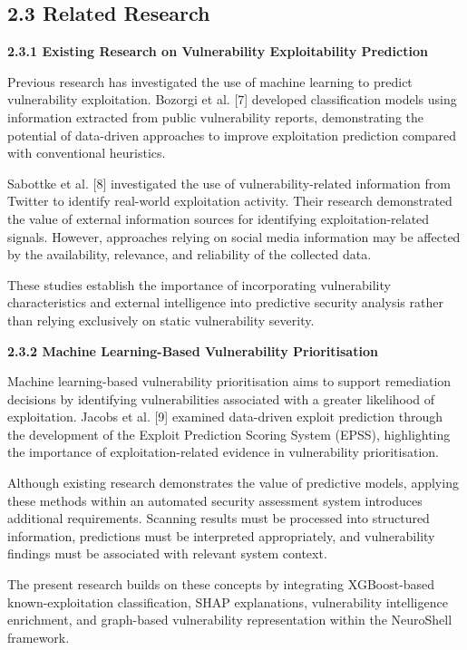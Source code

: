 \documentclass[
]{article}
\begin{document}
\hypertarget{related-research}{%
\subsection{2.3 Related Research}\label{related-research}}

\textbf{2.3.1 Existing Research on Vulnerability Exploitability
Prediction}

Previous research has investigated the use of machine learning to
predict vulnerability exploitation. Bozorgi et al. {[}7{]} developed
classification models using information extracted from public
vulnerability reports, demonstrating the potential of data-driven
approaches to improve exploitation prediction compared with conventional
heuristics.

Sabottke et al. {[}8{]} investigated the use of vulnerability-related
information from Twitter to identify real-world exploitation activity.
Their research demonstrated the value of external information sources
for identifying exploitation-related signals. However, approaches
relying on social media information may be affected by the availability,
relevance, and reliability of the collected data.

These studies establish the importance of incorporating vulnerability
characteristics and external intelligence into predictive security
analysis rather than relying exclusively on static vulnerability
severity.

\textbf{2.3.2 Machine Learning-Based Vulnerability Prioritisation}

Machine learning-based vulnerability prioritisation aims to support
remediation decisions by identifying vulnerabilities associated with a
greater likelihood of exploitation. Jacobs et al. {[}9{]} examined
data-driven exploit prediction through the development of the Exploit
Prediction Scoring System (EPSS), highlighting the importance of
exploitation-related evidence in vulnerability prioritisation.

Although existing research demonstrates the value of predictive models,
applying these methods within an automated security assessment system
introduces additional requirements. Scanning results must be processed
into structured information, predictions must be interpreted
appropriately, and vulnerability findings must be associated with
relevant system context.

The present research builds on these concepts by integrating
XGBoost-based known-exploitation classification, SHAP explanations,
vulnerability intelligence enrichment, and graph-based vulnerability
representation within the NeuroShell framework.
\end{document}
